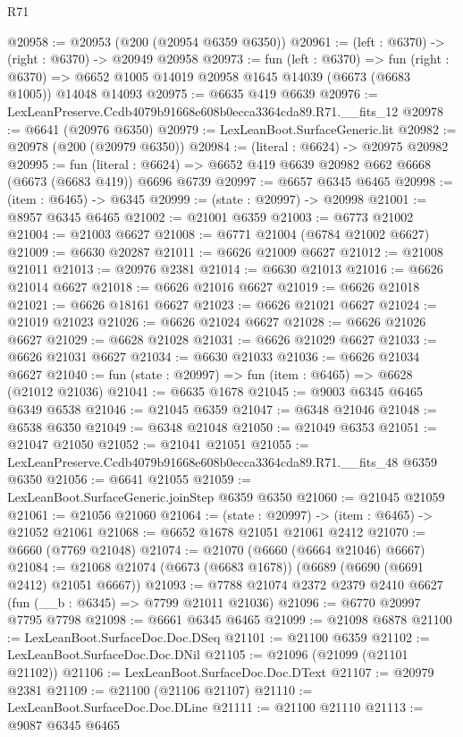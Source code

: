 \begin{lexlean}{R71}
\begin{coremodule}
@20958 := @20953 (@200 (@20954 @6359 @6350))
@20961 := (left : @6370) -> (right : @6370) -> @20949 @20958
@20973 := fun (left : @6370) =>
  fun (right : @6370) => @6652 @1005 @14019 @20958 @1645 @14039 (@6673 (@6683 @1005)) @14048 @14093
@20975 := @6635 @419 @6639
@20976 := LexLeanPreserve.Ccdb4079b91668e608b0ecca3364cda89.R71.__fits_12
@20978 := @6641 (@20976 @6350)
@20979 := LexLeanBoot.SurfaceGeneric.lit
@20982 := @20978 (@200 (@20979 @6350))
@20984 := (literal : @6624) -> @20975 @20982
@20995 := fun (literal : @6624) =>
  @6652 @419 @6639 @20982 @662 @6668 (@6673 (@6683 @419)) @6696 @6739
@20997 := @6657 @6345 @6465
@20998 := (item : @6465) -> @6345
@20999 := (state : @20997) -> @20998
@21001 := @8957 @6345 @6465
@21002 := @21001 @6359
@21003 := @6773 @21002
@21004 := @21003 @6627
@21008 := @6771 @21004 (@6784 @21002 @6627)
@21009 := @6630 @20287
@21011 := @6626 @21009 @6627
@21012 := @21008 @21011
@21013 := @20976 @2381
@21014 := @6630 @21013
@21016 := @6626 @21014 @6627
@21018 := @6626 @21016 @6627
@21019 := @6626 @21018
@21021 := @6626 @18161 @6627
@21023 := @6626 @21021 @6627
@21024 := @21019 @21023
@21026 := @6626 @21024 @6627
@21028 := @6626 @21026 @6627
@21029 := @6628 @21028
@21031 := @6626 @21029 @6627
@21033 := @6626 @21031 @6627
@21034 := @6630 @21033
@21036 := @6626 @21034 @6627
@21040 := fun (state : @20997) => fun (item : @6465) => @6628 (@21012 @21036)
@21041 := @6635 @1678
@21045 := @9003 @6345 @6465 @6349 @6538
@21046 := @21045 @6359
@21047 := @6348 @21046
@21048 := @6538 @6350
@21049 := @6348 @21048
@21050 := @21049 @6353
@21051 := @21047 @21050
@21052 := @21041 @21051
@21055 := LexLeanPreserve.Ccdb4079b91668e608b0ecca3364cda89.R71.__fits_48 @6359 @6350
@21056 := @6641 @21055
@21059 := LexLeanBoot.SurfaceGeneric.joinStep @6359 @6350
@21060 := @21045 @21059
@21061 := @21056 @21060
@21064 := (state : @20997) -> (item : @6465) -> @21052 @21061
@21068 := @6652 @1678 @21051 @21061 @2412
@21070 := @6660 (@7769 @21048)
@21074 := @21070 (@6660 (@6664 @21046) @6667)
@21084 := @21068 @21074 (@6673 (@6683 @1678)) (@6689 (@6690 (@6691 @2412) @21051 @6667))
@21093 := @7788 @21074 @2372 @2379 @2410 @6627 (fun (__b : @6345) => @7799 @21011 @21036)
@21096 := @6770 @20997 @7795 @7798
@21098 := @6661 @6345 @6465
@21099 := @21098 @6878
@21100 := LexLeanBoot.SurfaceDoc.Doc.DSeq
@21101 := @21100 @6359
@21102 := LexLeanBoot.SurfaceDoc.Doc.DNil
@21105 := @21096 (@21099 (@21101 @21102))
@21106 := LexLeanBoot.SurfaceDoc.Doc.DText
@21107 := @20979 @2381
@21109 := @21100 (@21106 @21107)
@21110 := LexLeanBoot.SurfaceDoc.Doc.DLine
@21111 := @21100 @21110
@21113 := @9087 @6345 @6465

\end{coremodule}
\end{lexlean}
